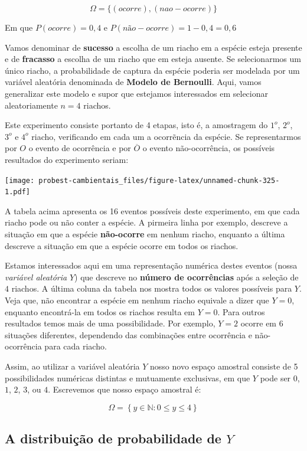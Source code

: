 \documentclass[
]{book}
\begin{document}
\[\Omega = \{(ocorre), (nao-ocorre)\}\]

Em que \(P(ocorre) = 0,4\) e \(P(não-ocorre) = 1-0,4 = 0,6\)

Vamos denominar de \textbf{sucesso} a escolha de um riacho em a espécie esteja presente e de \textbf{fracasso} a escolha de um riacho que em esteja ausente. Se selecionarmos um único riacho, a probabilidade de captura da espécie poderia ser modelada por um variável aleatória denominada de \textbf{Modelo de Bernoulli}. Aqui, vamos generalizar este modelo e supor que estejamos interessados em selecionar aleatoriamente \(n = 4\) riachos.

Este experimento consiste portanto de 4 etapas, isto é, a amostragem do \(1^o\), \(2^o\), \(3^o\) e \(4^o\) riacho, verificando em cada um a ocorrẽncia da espécie. Se representarmos por \(O\) o evento de ocorrência e por \(\overline{O}\) o evento não-ocorrência, os possíveis resultados do experimento seriam:

\texttt{[image: probest-cambientais\_files/figure-latex/unnamed-chunk-325-1.pdf]}

A tabela acima apresenta os 16 eventos possíveis deste experimento, em que cada riacho pode ou não conter a espécie. A pirmeira linha por exemplo, descreve a situação em que a espécie \textbf{não-ocorre} em nenhum riacho, enquanto a última descreve a situação em que a espécie ocorre em todos os riachos.

Estamos interessados aqui em uma representação numérica destes eventos (nossa \emph{variável aleatória} \(Y\)) que descreve no \textbf{número de ocorrências} após a seleção de \(4\) riachos. A última coluna da tabela nos mostra todos os valores possíveis para \(Y\). Veja que, não encontrar a espécie em nenhum riacho equivale a dizer que \(Y = 0\), enquanto encontrá-la em todos os riachos resulta em \(Y = 0\). Para outros resultados temos mais de uma possibilidade. Por exemplo, \(Y = 2\) ocorre em 6 situações diferentes, dependendo das combinações entre ocorrência e não-ocorrência para cada riacho.

Assim, ao utilizar a variável aleatória \(Y\) nosso novo espaço amostral consiste de 5 possibilidades numéricas distintas e mutuamente exclusivas, em que \(Y\) pode ser \(0\), \(1\), \(2\), \(3\), ou \(4\). Escrevemos que nosso espaço amostral é:

\[\Omega = \left\{ y \in \mathbb{N}: 0 \le y \le 4 \right\}\]

\hypertarget{a-distribuiuxe7uxe3o-de-probabilidade-de-y}{%
\subsection*{\texorpdfstring{A distribuição de probabilidade de \(Y\)}{A distribuição de probabilidade de Y}}\label{a-distribuiuxe7uxe3o-de-probabilidade-de-y}}
\end{document}
